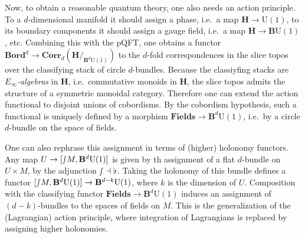     Now, to obtain a reasonable quantum theory, one also needs an action principle. To a $d$-dimensional manifold it should assign a phase, i.e.~a map $\mathbf{H}\rightarrow\mathrm{U}(1)$, to its boundary components it should assign a gauge field, i.e.~a map $\mathbf{H}\rightarrow\mathbf{B}\mathrm{U}(1)$, etc. Combining this with the pQFT, one obtains a functor $\mathbf{Bord}^d\rightarrow\mathbf{Corr}_d(\mathbf{H}/_{\mathbf{B}^d\mathrm{U}(1)})$ to the $d$-fold correspondences in the slice topos over the classifying stack of circle $d$-bundles. Because the classiyfing stacks are \textit{$E_\infty$-algebras} in $\mathbf{H}$, i.e.~commutative monoids in $\mathbf{H}$, the slice topos admits the structure of a symmetric monoidal category. Therefore one can extend the action functional to disjoint unions of cobordisms.
    By the cobordism hypothesis, such a functional is uniquely defined by a morphism $\mathbf{Fields}\rightarrow\mathbf{B}^d\mathrm{U}(1)$, i.e.~by a circle $d$-bundle on the space of fields.

    One can also rephrase this assignment in terms of (higher) holonomy functors. Any map $U\rightarrow[\smallint\!M,\mathbf{B}^d\mathrm{U}(1)]$ is given by th assignment of a flat $d$-bundle on $U\times M$, by the adjunction $\smallint\dashv\flat$. Taking the holonomy of this bundle defines a functor $[\smallint\!M,\mathbf{B}^d\mathrm{U}(1)]\rightarrow\mathbf{B}^{d-k}\mathrm{U}(1)$, where $k$ is the dimension of $U$. Composition with the classifying functor $\mathbf{Fields}\rightarrow\mathbf{B}^d\mathrm{U}(1)$ induces an assignment of $(d-k)$-bundles to the spaces of fields on $M$. This is the generalization of the (Lagrangian) action principle, where integration of Lagrangians is replaced by assigning higher holonomies.